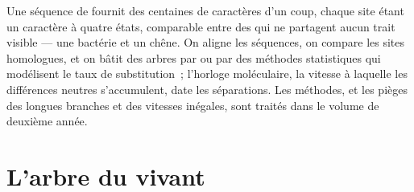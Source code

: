 \begin{remark}\label{rem:b1:classifying-biodiversity:molecular}
Une séquence de  fournit des centaines de caractères d'un coup,
chaque site étant un caractère à quatre états, comparable entre des
 qui ne partagent aucun trait visible --- une bactérie et un
chêne. On aligne les séquences, on compare les sites homologues, et on
bâtit des arbres par  ou par des méthodes statistiques qui
modélisent le taux de substitution~; l'horloge moléculaire, la vitesse à
laquelle les différences neutres s'accumulent, date les séparations.
Les méthodes, et les pièges des longues branches et des vitesses
inégales, sont traités dans le volume de deuxième année.
\end{remark}

\section{L'arbre du vivant}

